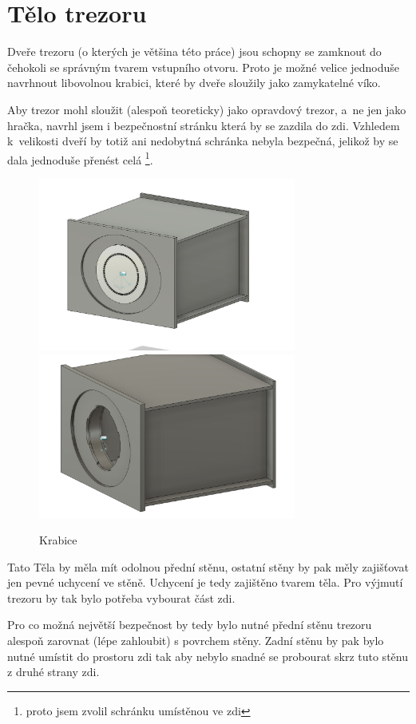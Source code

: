 \section{Tělo trezoru} %
Dveře trezoru (o kterých je většina této práce) jsou schopny se zamknout do čehokoli se správným tvarem vstupního otvoru. 
Proto je možné velice jednoduše navrhnout libovolnou krabici, které by dveře sloužily jako zamykatelné víko. 

Aby trezor mohl sloužit (alespoň teoreticky) jako opravdový trezor, a~ne jen jako hračka, navrhl jsem i bezpečnostní stránku která by se zazdila do zdi. 
Vzhledem k~velikosti dveří by totiž ani nedobytná schránka nebyla bezpečná, jelikož by se dala jednoduše přenést celá \footnote{proto jsem zvolil schránku umístěnou ve zdi}. 

\begin{figure}[htbp]
    \centering
    \includegraphics[width=240pt]{kapitoly/obrazky/E4/bedna/bedna.png}
    \includegraphics[width=240pt]{kapitoly/obrazky/E4/bedna/jen-bedna.png}
    \caption{Krabice}
    \label{fig:E4-bedna}
\end{figure}

Tato Těla by měla mít odolnou přední stěnu, ostatní stěny by pak měly zajišťovat jen pevné uchycení ve stěně.
Uchycení je tedy zajištěno tvarem těla. Pro výjmutí trezoru by tak bylo potřeba vybourat část zdi.

Pro co možná největší bezpečnost by tedy bylo nutné přední stěnu trezoru alespoň zarovnat (lépe zahloubit) s povrchem stěny.
Zadní stěnu by pak bylo nutné umístit do prostoru zdi tak aby nebylo snadné se probourat skrz tuto stěnu z druhé strany zdi.  %